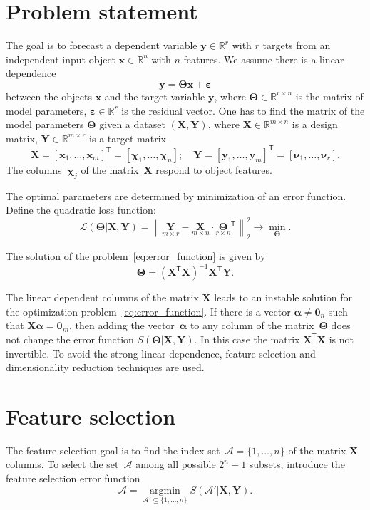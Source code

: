 \documentclass[12pt,twoside]{article}
\theoremstyle{definition}
\newcommand{\bx}{\mathbf{x}}
\newcommand{\by}{\mathbf{y}}
\newcommand{\bY}{\mathbf{Y}}
\newcommand{\bX}{\mathbf{X}}
\newcommand{\bbR}{\mathbb{R}}
\newcommand{\cA}{\mathcal{A}}
\newcommand{\T}{\mathsf{T}}
\newcommand{\bchi}{\boldsymbol{\chi}}
\newcommand{\bnu}{\boldsymbol{\nu}}
\newcommand{\bTheta}{\boldsymbol{\Theta}}
\newcommand{\bZero}{\boldsymbol{0}}
\newcommand{\argmin}{\mathop{\arg \min}\limits}
\begin{document}
\section{Problem statement}
The goal is to forecast a dependent variable $\by \in \bbR^r$ with $r$ targets from an independent input object $\bx \in \bbR^n$ with $n$ features.
We assume there is a linear dependence
\begin{equation}
	\by = \bTheta \bx+ \boldsymbol{\varepsilon}
	\label{eq:model}
\end{equation}
between the objects $\bx$ and the target variable $\by$,
where $\bTheta \in \bbR^{r \times n}$ is the matrix of model parameters, $\boldsymbol{\varepsilon} \in \bbR^{r}$ is the residual vector.
One has to find the matrix of the model parameters $\bTheta$ given a dataset $\left( \bX, \bY \right)$, where $\bX \in \bbR^{m \times n}$ is a design matrix, $\bY \in \bbR^{m \times r}$ is a target matrix
\[
	\bX = [\bx_1, \dots, \bx_m]^{\T} =  [\bchi_1, \dots, \bchi_n]; \quad \bY = [\by_1, \dots, \by_m]^{\T} =  [\bnu_1, \dots, \bnu_r].
\]
The columns~$\bchi_j$ of the matrix~$\bX$ respond to object features.

The optimal parameters are determined by minimization of an error function.
Define the quadratic loss function:
\begin{equation}
	\mathcal{L}(\bTheta | \bX, \bY) = {\left\| \underset{m \times r}{\mathbf{Y}}  - \underset{m \times n}{\bX} \cdot \underset{r \times n}{\bTheta}^{\T} \right\| }_2^2 \rightarrow\min_{\bTheta}.
\label{eq:error_function}
\end{equation}

 The solution of the problem~\eqref{eq:error_function} is given by
 \[
 	\bTheta = (\bX^{\T} \bX)^{-1} \bX^{\T} \bY.
 \]

 The linear dependent columns of the matrix $\bX$ leads to an instable solution for the optimization problem~\eqref{eq:error_function}.
 If there is a vector $\boldsymbol{\alpha} \neq \bZero_n$ such that $\bX \boldsymbol{\alpha}= \bZero_m$, then adding the vector~$\boldsymbol{\alpha}$ to any column of the matrix~$\bTheta$ does not change the error function $S(\bTheta | \bX, \bY)$.
 In this case the matrix $\bX^{\T} \bX$ is not invertible.
 To avoid the strong linear dependence, feature selection and dimensionality reduction techniques are used.

 \section{Feature selection}
 The feature selection goal is to find the index set~$\cA = \{1, \dots, n\}$ of the matrix $\bX$ columns. To select the set~$\cA$ among all possible $2^n - 1$ subsets, introduce the feature selection error function
\begin{equation}
	\cA = \argmin_{\cA' \subseteq \{1, \dots, n\}} S(\cA' | \bX, \bY).
	\label{eq:subset_selection}
\end{equation}
\end{document}
